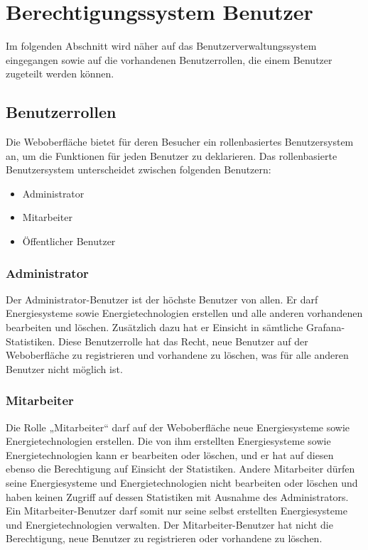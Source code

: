 \newpage
\section{Berechtigungssystem Benutzer}
Im folgenden Abschnitt wird näher auf das Benutzerverwaltungssystem eingegangen sowie auf die vorhandenen Benutzerrollen, die einem Benutzer zugeteilt werden können.

\subsection{Benutzerrollen}
Die Weboberfläche bietet für deren Besucher ein rollenbasiertes Benutzersystem an, um die Funktionen für jeden Benutzer zu deklarieren.
Das rollenbasierte Benutzersystem unterscheidet zwischen folgenden Benutzern:

\begin{itemize}
	\item Administrator 
	\item Mitarbeiter
	\item Öffentlicher Benutzer 
\end{itemize}



\subsubsection{Administrator}
Der Administrator-Benutzer ist der höchste Benutzer von allen. Er darf Energiesysteme sowie Energietechnologien erstellen und alle anderen vorhandenen bearbeiten und löschen. Zusätzlich dazu hat er Einsicht in sämtliche Grafana-Statistiken. Diese Benutzerrolle hat das Recht, neue Benutzer auf der Weboberfläche zu registrieren und vorhandene zu löschen, was für alle anderen Benutzer nicht möglich ist.

\subsubsection{Mitarbeiter}
Die Rolle „Mitarbeiter“ darf auf der Weboberfläche neue Energiesysteme sowie Energietechnologien erstellen. Die von ihm erstellten Energiesysteme sowie Energietechnologien kann er bearbeiten oder  löschen, und er hat auf diesen ebenso die Berechtigung auf Einsicht der Statistiken. Andere Mitarbeiter dürfen seine Energiesysteme und Energietechnologien nicht bearbeiten oder löschen und haben keinen Zugriff auf dessen Statistiken mit Ausnahme des Administrators. Ein Mitarbeiter-Benutzer darf somit nur seine selbst erstellten Energiesysteme und Energietechnologien verwalten. Der Mitarbeiter-Benutzer hat nicht die Berechtigung, neue Benutzer zu registrieren oder vorhandene zu löschen.

